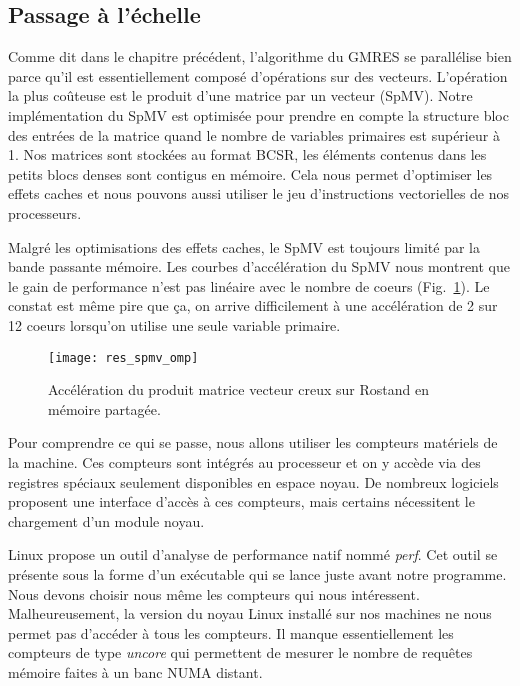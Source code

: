 \subsection{Passage à l'échelle}
Comme dit dans le chapitre précédent, l'algorithme du GMRES se parallélise bien parce qu'il est essentiellement composé d'opérations sur des vecteurs.
%
L'opération la plus coûteuse est le produit d'une matrice par un vecteur (SpMV).
%
Notre implémentation du SpMV est optimisée pour prendre en compte la structure bloc des entrées de la matrice quand le nombre de variables primaires est supérieur à 1.
%
Nos matrices sont stockées au format BCSR, les éléments contenus dans les petits blocs denses sont contigus en mémoire.
%
Cela nous permet d'optimiser les effets caches et nous pouvons aussi utiliser le jeu d'instructions vectorielles de nos processeurs.

Malgré les optimisations des effets caches, le SpMV est toujours limité par la bande passante mémoire.
%
Les courbes d'accélération du SpMV nous montrent que le gain de performance n'est pas linéaire avec le nombre de coeurs (Fig.~\ref{fig:res_spmv_omp_rostand}).
%
Le constat est même pire que ça, on arrive difficilement à une accélération de 2 sur 12 coeurs lorsqu'on utilise une seule variable primaire.
\begin{figure}[!h]
  \centering
  \texttt{[image: res\_spmv\_omp]}
  \caption{Accélération du produit matrice vecteur creux sur Rostand en mémoire partagée.}
  \label{fig:res_spmv_omp_rostand}
\end{figure}

Pour comprendre ce qui se passe, nous allons utiliser les compteurs matériels de la machine.
%
Ces compteurs sont intégrés au processeur et on y accède via des registres spéciaux seulement disponibles en espace noyau.
%
De nombreux logiciels proposent une interface d'accès à ces compteurs, mais certains nécessitent le chargement d'un module noyau.


Linux propose un outil d'analyse de performance natif nommé {\em perf}.
%
Cet outil se présente sous la forme d'un exécutable qui se lance juste avant notre programme.
%
Nous devons choisir nous même les compteurs qui nous intéressent.
%
Malheureusement, la version du noyau Linux installé sur nos machines ne nous permet pas d'accéder à tous les compteurs.
%
Il manque essentiellement les compteurs de type {\em uncore} qui permettent de mesurer le nombre de requêtes mémoire faites à un banc NUMA distant.




